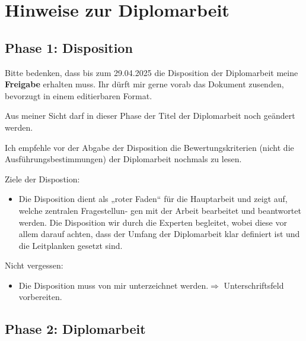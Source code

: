 \documentclass[
11pt,
captions=tableheading,
smallheadings,
headsepline,
footsepline, 
captions=tableheading,
parskip=half-,
]{scrartcl}
\begin{document}
\section*{Hinweise zur Diplomarbeit}

\subsection*{Phase 1: Disposition}
Bitte bedenken, dass bis zum 
29.04.2025 
die Disposition der Diplomarbeit meine \textbf{Freigabe} erhalten muss. Ihr dürft mir gerne vorab das Dokument zusenden, bevorzugt in einem editierbaren Format.

Aus meiner Sicht darf in dieser Phase der Titel der Diplomarbeit noch geändert werden.

Ich empfehle vor der Abgabe der Disposition die Bewertungskriterien (nicht die Ausführungsbestimmungen) der Diplomarbeit nochmals zu lesen.

Ziele der Dispostion: 
\begin{itemize}
    \item Die Disposition dient als „roter Faden“ für die Hauptarbeit und zeigt auf, welche zentralen Fragestellun-
    gen mit der Arbeit bearbeitet und beantwortet werden. Die Disposition wir durch die Experten begleitet,
    wobei diese vor allem darauf achten, dass der Umfang der Diplomarbeit klar definiert ist und die Leitplanken gesetzt sind.
\end{itemize}


Nicht vergessen:
\begin{itemize}
    \item Die Disposition muss von mir unterzeichnet werden.$\Rightarrow$ Unterschriftsfeld vorbereiten.
\end{itemize}



\subsection*{Phase 2: Diplomarbeit}
\end{document}
